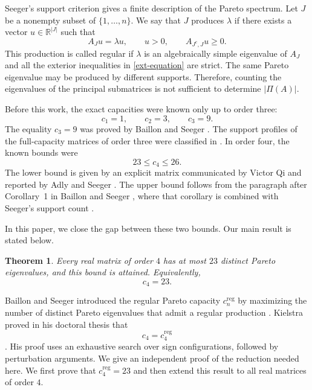 \documentclass[11pt,a4paper]{article}
\newtheorem{theorem}{Theorem}[section]
\theoremstyle{definition}
\newcommand{\R}{\mathbb R}
\begin{document}
Seeger's support criterion \cite[Theorem~4.1]{Seeger1999} gives a finite description of the Pareto spectrum. Let $J$ be a nonempty subset of $\{1,\ldots,n\}$. We say that $J$ produces $\lambda$ if there exists a vector $u\in\R^{|J|}$ such that
\begin{equation}
\label{ext-equation}
A_Ju=\lambda u,
\qquad
u>0,
\qquad
A_{J^{\mathrm c},J}u\geq0.
\end{equation}
This production is called regular if $\lambda$ is an algebraically simple eigenvalue of $A_J$ and all the exterior inequalities in \eqref{ext-equation} are strict. The same Pareto eigenvalue may be produced by different supports. Therefore, counting the eigenvalues of the principal submatrices is not sufficient to determine $|\Pi(A)|$.

Before this work, the exact capacities were known only up to order three:
$$
c_1=1,
\qquad
c_2=3,
\qquad
c_3=9.
$$
The equality $c_3=9$ was proved by Baillon and Seeger \cite{BaillonSeeger2021}. The support profiles of the full-capacity matrices of order three were classified in \cite{Adly2026}. In order four, the known bounds were
$$
23\leq c_4\leq26.
$$
The lower bound is given by an explicit matrix communicated by Victor Qi and reported by Adly and Seeger
\cite[Table~2]{AdlySeeger2011}. The upper bound follows from the paragraph after Corollary~1 in Baillon and Seeger \cite[p.~8]{BaillonSeeger2021}, where that corollary is combined with Seeger's support count \cite[Lemma~5.1]{Seeger1999}.

In this paper, we close the gap between these two bounds. Our main result is stated below.

\begin{theorem}
\label{thm:main}
Every real matrix of order $4$ has at most $23$ distinct Pareto eigenvalues, and this bound is attained. Equivalently,
$$
c_4=23.
$$
\end{theorem}

Baillon and Seeger introduced the regular Pareto capacity $c_n^{\mathrm{reg}}$ by maximizing the number of distinct Pareto eigenvalues that admit a regular production \cite{BaillonSeeger2020}. Kielstra proved in his doctoral thesis that
$$
c_4=c_4^{\mathrm{reg}}
$$
\cite[Corollary~6.1.7]{Kielstra2023}. His proof uses an exhaustive search over sign configurations, followed by perturbation arguments. We give an independent proof of the reduction needed here. We first prove that $c_4^{\mathrm{reg}}=23$ and then extend this result to all real matrices of order $4$.
\end{document}
